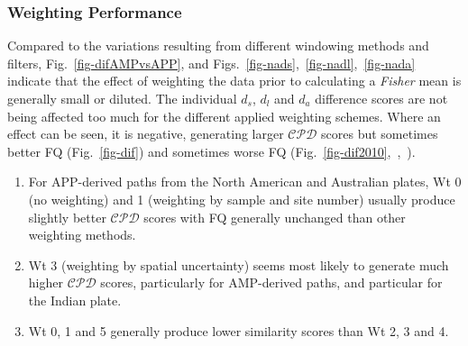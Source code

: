 \subsubsection{Weighting Performance}

Compared to the variations resulting from different windowing methods and
filters, Fig.~\ref{fig-difAMPvsAPP}, and
Figs.~\ref{fig-nads},~\ref{fig-nadl},~\ref{fig-nada} indicate that the effect of
weighting the data prior to calculating a \emph{Fisher} mean is generally small
or diluted. The individual $d_s$, $d_l$ and $d_a$ difference scores are not
being affected too much for the different applied weighting schemes. Where an
effect can be seen, it is negative, generating larger $\mathcal{CPD}$ scores but
sometimes better FQ (Fig.~\ref{fig-dif}) and sometimes worse FQ
(Fig.~\ref{fig-dif2010},~,~).
%
\begin{enumerate}
  \item For APP-derived paths from the North American and Australian plates, Wt
    0 (no weighting) and 1 (weighting by sample and site number) usually produce
    slightly better $\mathcal{CPD}$ scores with FQ generally unchanged than
    other weighting methods.
  \item Wt 3 (weighting by spatial uncertainty) seems most likely to generate
    much higher $\mathcal{CPD}$ scores, particularly for AMP-derived paths, and
    particular for the Indian plate.
  \item Wt 0, 1 and 5 generally produce lower similarity scores than Wt 2, 3 and
    4.
\end{enumerate}

